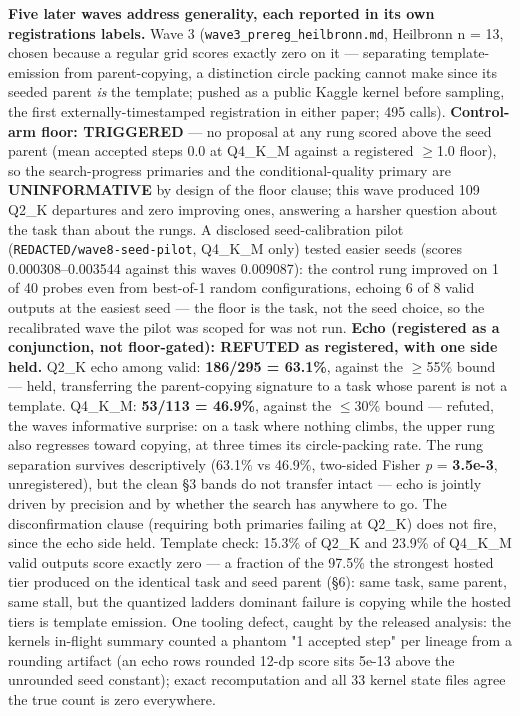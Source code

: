 \textbf{Five later waves address generality, each reported in its own registration\textquotesingle s labels.} Wave 3 (\texttt{wave3\_prereg\_heilbronn.md}, Heilbronn n = 13, chosen because a regular grid scores exactly zero on it --- separating template-emission from parent-copying, a distinction circle packing cannot make since its seeded parent \emph{is} the template; pushed as a public Kaggle kernel before sampling, the first externally-timestamped registration in either paper; 495 calls). \textbf{Control-arm floor: TRIGGERED} --- no proposal at any rung scored above the seed parent (mean accepted steps 0.0 at Q4\_K\_M against a registered \(\geq\)1.0 floor), so the search-progress primaries and the conditional-quality primary are \textbf{UNINFORMATIVE} by design of the floor clause; this wave produced 109 Q2\_K departures and zero improving ones, answering a harsher question about the task than about the rungs. A disclosed seed-calibration pilot (\texttt{REDACTED/wave8-seed-pilot}, Q4\_K\_M only) tested easier seeds (scores 0.000308--0.003544 against this wave\textquotesingle s 0.009087): the control rung improved on 1 of 40 probes even from best-of-1 random configurations, echoing 6 of 8 valid outputs at the easiest seed --- the floor is the task, not the seed choice, so the recalibrated wave the pilot was scoped for was not run. \textbf{Echo (registered as a conjunction, not floor-gated): REFUTED as registered, with one side held.} Q2\_K echo among valid: \textbf{186/295 = 63.1\%}, against the \(\geq\)55\% bound --- held, transferring the parent-copying signature to a task whose parent is not a template. Q4\_K\_M: \textbf{53/113 = 46.9\%}, against the \(\leq\)30\% bound --- refuted, the wave\textquotesingle s informative surprise: on a task where nothing climbs, the upper rung also regresses toward copying, at three times its circle-packing rate. The rung separation survives descriptively (63.1\% vs 46.9\%, two-sided Fisher \emph{p} = \textbf{3.5e-3}, unregistered), but the clean §3 bands do not transfer intact --- echo is jointly driven by precision and by whether the search has anywhere to go. The disconfirmation clause (requiring both primaries failing at Q2\_K) does not fire, since the echo side held. Template check: 15.3\% of Q2\_K and 23.9\% of Q4\_K\_M valid outputs score exactly zero --- a fraction of the 97.5\% the strongest hosted tier produced on the identical task and seed parent (§6): same task, same parent, same stall, but the quantized ladder\textquotesingle s dominant failure is copying while the hosted tiers\textquotesingle{} is template emission. One tooling defect, caught by the released analysis: the kernel\textquotesingle s in-flight summary counted a phantom "1 accepted step" per lineage from a rounding artifact (an echo row\textquotesingle s rounded 12-dp score sits 5e-13 above the unrounded seed constant); exact recomputation and all 33 kernel state files agree the true count is zero everywhere.

